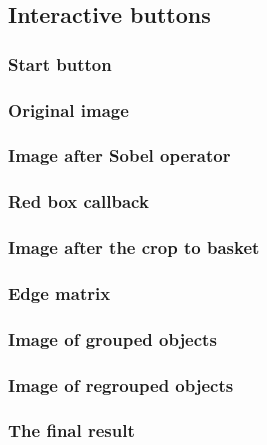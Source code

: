 \documentclass[10pt]{article}
\begin{document}
\subsection{Interactive buttons}
\subsubsection{Start button}

\subsubsection{Original image}

\subsubsection{Image after Sobel operator}

\subsubsection{Red box callback}

\subsubsection{Image after the crop to basket}

\subsubsection{Edge matrix}

\subsubsection{Image of grouped objects}

\subsubsection{Image of regrouped objects}

\subsubsection{The final result}

\end{document}
